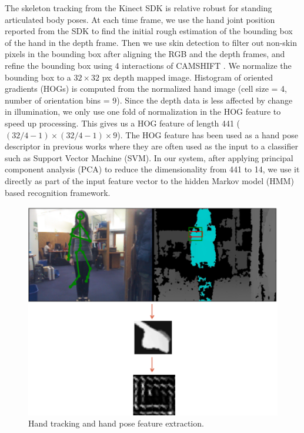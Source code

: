 \documentclass[conference]{IEEEtran}
\begin{document}
The skeleton tracking from the Kinect SDK is
relative robust for standing articulated body poses. At each time frame, we use
the hand joint position reported from the SDK to find the initial rough estimation of the
bounding box of the hand in the depth frame. Then we use skin detection to
filter out non-skin pixels in the bounding box after aligning the RGB and the
depth frames, and refine the bounding box using 4 interactions of CAMSHIFT
\cite{bradski98}. We normalize the bounding box to a $32\times 32$ px depth
mapped image. Histogram of oriented gradients (HOGs) \cite{dalal05} is computed from
the normalized hand image (cell size = 4, number of orientation bins = 9).
Since the depth data is less affected by change in illumination, we only use one
fold of normalization in the HOG feature to speed up processing.
This gives us a HOG feature of length 441 ($(32/4 - 1)\times (32/4 - 1)\times 9$). The HOG
feature has been used as a hand pose descriptor in previous works \cite{song12} where they are often 
used as the input to a classifier such as Support Vector Machine
(SVM). In our system, after applying principal component analysis (PCA) to
reduce the dimensionality from 441 to 14, we use it directly as part of the input feature
vector to the hidden Markov model (HMM) based recognition framework.

\begin{figure}[!t]
\centering
\includegraphics[width=\columnwidth]{fig/hand_tracking.ps}
\caption{Hand tracking and hand pose feature extraction.}
\label{fig:tracking}
\end{figure}
\end{document}
